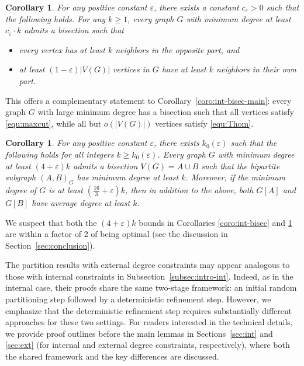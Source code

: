 \documentclass{aic}
\newtheorem{corollary}[dfn]{Corollary}
\begin{document}
	\begin{corollary}\label{coro:ext-bisec-main}
		For any positive constant $\varepsilon$, there exists a constant $c_\varepsilon>0$ such that the following holds.
		For any $k\geq 1$, every graph $G$ with minimum degree at least $c_\varepsilon\cdot k$ admits a bisection such that
		\begin{itemize}
			\item[(i).] every vertex has at least $k$ neighbors in the opposite part, and
			\item[(ii).] at least $(1-\varepsilon)|V(G)|$ vertices in $G$ have at least $k$ neighbors in their own part.
		\end{itemize}
	\end{corollary}
	
	This offers a complementary statement to Corollary~\ref{coro:int-bisec-main}:
	every graph $G$ with large minimum degree has a bisection such that all vertices satisfy \eqref{equ:maxcut}, while all but $o(|V(G)|)$ vertices satisfy \eqref{equ:Thom}.
	
	\begin{corollary}\label{coro:ext-bisec}
		For any positive constant $\varepsilon$, there exists $k_0(\varepsilon)$ such that the following holds for all integers $k \ge k_0(\varepsilon)$.
		Every graph $G$ with minimum degree at least $(4 + \varepsilon)k$ admits a bisection $V(G) = A \cup B$ such that
		the bipartite subgraph $(A,B)_G$ has minimum degree at least $k$.
        Moreover, if the minimum degree of $G$ is at least $\left(\frac{16}{3} + \varepsilon\right)k$, then in addition to the above, both $G[A]$ and $G[B]$ have average degree at least $k$.
	\end{corollary}


	
	We suspect that both the $(4+\varepsilon)k$ bounds in Corollaries \ref{coro:int-bisec} and \ref{coro:ext-bisec} are within a factor of 2 of being optimal (see the discussion in Section~\ref{sec:conclusion}).
	
	The partition results with external degree constraints may appear analogous to those with internal constraints in Subsection~\ref{subsec:intro-int}. Indeed, as in the internal case, their proofs share the same two-stage framework: an initial random partitioning step followed by a deterministic refinement step. However, we emphasize that the deterministic refinement step requires substantially different approaches for these two settings.
	For readers interested in the technical details, we provide proof outlines before the main lemmas in Sections~\ref{sec:int} and \ref{sec:ext} (for internal and external degree constraints, respectively), where both the shared framework and the key differences are discussed.
	
\end{document}
